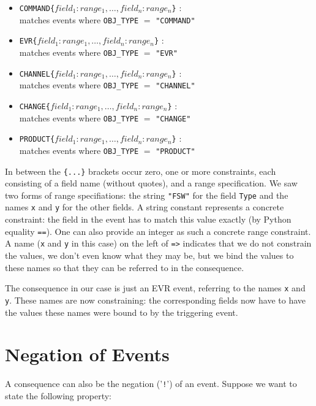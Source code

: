 \documentclass{report}
\newcommand{\python}{{\sc Python}}
\begin{document}
\begin{itemize}
  \item {\tt COMMAND\{$field_1 : range_1,\ldots,field_n : range_n$\}} :\\ 
  matches events where {\tt OBJ\_TYPE} $=$ {\tt "COMMAND"}
  \item {\tt EVR\{$field_1 : range_1,\ldots,field_n : range_n$\}} :\\ 
  matches events where {\tt OBJ\_TYPE} $=$ {\tt "EVR"}
  \item {\tt CHANNEL\{$field_1 : range_1,\ldots,field_n : range_n$\}} :\\ 
  matches events where {\tt OBJ\_TYPE} $=$ {\tt "CHANNEL"}
  \item {\tt CHANGE\{$field_1 : range_1,\ldots,field_n : range_n$\}} :\\ 
  matches events where {\tt OBJ\_TYPE} $=$ {\tt "CHANGE"}
  \item {\tt PRODUCT\{$field_1 : range_1,\ldots,field_n : range_n$\}} :\\ 
  matches events where {\tt OBJ\_TYPE} $=$ {\tt "PRODUCT"}
\end{itemize}

\noindent In between the {\tt \{...\}} brackets occur zero, one or more constraints, each consisting of a field name (without quotes), and a range specification. We saw two forms of range specifiations:
the string {\tt "FSW"} for the field {\tt Type} and the names {\tt x} and {\tt y} for the other fields. A string
constant represents a concrete constraint: the field in the event has to match this value exactly (by \python{}
equality {\tt ==}). One can also provide an integer as such a concrete range constraint. A name ({\tt x} and {\tt y} in this case) on the left of {\tt =>} indicates that we do not constrain the values, we
don't even know what they may be, but we bind the values to these names so that they can be referred to
in the consequence.

The consequence in our case is just an EVR event, referring to the names {\tt x} and {\tt y}. These names are now
constraining: the corresponding fields now have to have the values these names were bound to by the
triggering event. 


\section{Negation of Events}

A consequence can also be the negation ('{\tt !}') of an event. Suppose we want to state the
following property:
\end{document}
